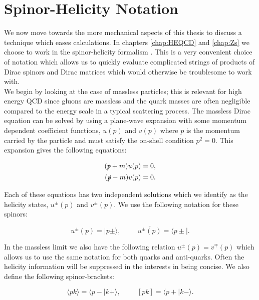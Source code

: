 \section{Spinor-Helicity Notation}
	\label{sec:SpinorHelicity}

	We now move towards the more mechanical aspects of this thesis to discuss a technique which eases calculations.
	In chapters \ref{chap:HEQCD} and \ref{chap:Zs} we choose to work in the spinor-helicity formalism \cite{Dixon:1996wi,CBO9781107706620A004}.
	This is a very convenient choice of notation which allows us to quickly evaluate complicated strings of products of
	Dirac spinors and Dirac matrices which would otherwise be troublesome to work with.\\We begin by looking at the case
	of massless particles; this is relevant for high energy QCD since gluons are massless and the quark masses are often
	negligible compared to the energy scale in a typical scattering process.  The massless Dirac equation can be solved
	by using a plane-wave expansion with some momentum dependent coefficient functions, $u(p)$ and $v(p)$ where $p$ is the
	momentum carried by the particle and must satisfy the on-shell condition $p^2=0$.  This expansion gives the following
	equations:

	\begin{align}
	\begin{split}
		(\slashed p + m)u(p) = 0, \\
		(\slashed p - m)v(p) = 0.
	\end{split}
	\end{align}

	Each of these equations has two independent solutions which we identify as the helicity states, $u^\pm(p)$ and $v^\pm(p)$.
	We use the following notation for these spinors:

	\begin{equation}
		u^\pm(p) = \mid p\pm\rangle, \hspace{1cm} \overline{u^\pm(p)} = \langle p\pm\mid.
	\end{equation}

	In the massless limit we also have the following relation $u^\pm(p) = v^\mp(p)$ which allows us to use the same notation for both
	quarks and anti-quarks.  Often the helicity information will be suppressed in the interests in being concise.  We also define the
	following spinor-brackets:

	\begin{equation}
		\langle pk\rangle = \langle p-\mid k+\rangle, \hspace{1cm} [pk] = \langle p+\mid k-\rangle.
	\end{equation}

